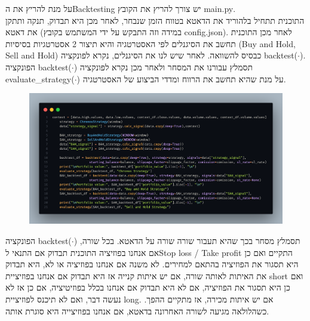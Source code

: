 \documentclass[a4paper,11pt]{article}
\newcommand{\te}[1]{\textenglish{#1}}
\begin{document}
\begin{RTL}
על מנת להריץ את ה\te{Backtesting} יש צורך להריץ את הקובץ \te{main.py}. \\
התוכנית תתחיל בלהוריד את הדאטא בטווח הזמן שנבחר, לאחר מכן היא תבדוק, תנקה ותתקן את דאטא (במידה וזה התבקש על ידי המשתמש בקובץ \te{config.json}). לאחר מכן התוכנית תחשב את הסיגנלים לפי האסטרטגיה והיא תיצור 2 אסטרטגיות בסיסיות (\te{Buy and Hold, Sell and Hold}) כבסיס להשוואה.
לאחר שיש לנו את הסיגנלים, נקרא לפונקציה \te{backtest($\cdot$)}. הפונקציה \te{backtest($\cdot$)} תסמלץ עבורנו את המסחר ולאחר מכן נקרא לפונקציה \te{evaluate\_strategy($\cdot$)} על מנת שהיא תחשב את הרווח ומדדי הביצוע של האסטרטגיה.
\begin{figure}[H]
    \centering
    \includegraphics[width=.9\textwidth]{backtesting.png}
\end{figure}
הפונקציה \te{backtest($\cdot$)} תסמלץ מסחר בכך שהיא תעבור שורה שורה על הדאטא. בכל שורה, אם אנחנו בפוזיציה התוכנית תבדוק אם התנאי ל\te{Stop loss / Take profit} התקיים ואם כן היא תסגור את הפוזיציה בהתאם למחירים.
לא משנה אם אנחנו בפוזיציה או לא, היא תבדוק את האיתות לאותה שורה, אם יש איתות קנייה אז היא תבדוק אם אנחנו בפוזיציית \te{short} ואם כן היא תסגור את הפוזיציה, אם לא היא תבדוק אם אנחנו בכלל בפוזיטיציה, אם כן אז לא נעשה דבר, ואם לא תיכנס לפוזיציית \te{long}. אם יש איתות מכירה, אז מתקיים ההפך.
 כשהלולאה מגיעה לשורה האחרונה בדאטא, אם אנחנו בפוזיצייה היא סוגרת אותה.




\end{RTL}
\end{document}
